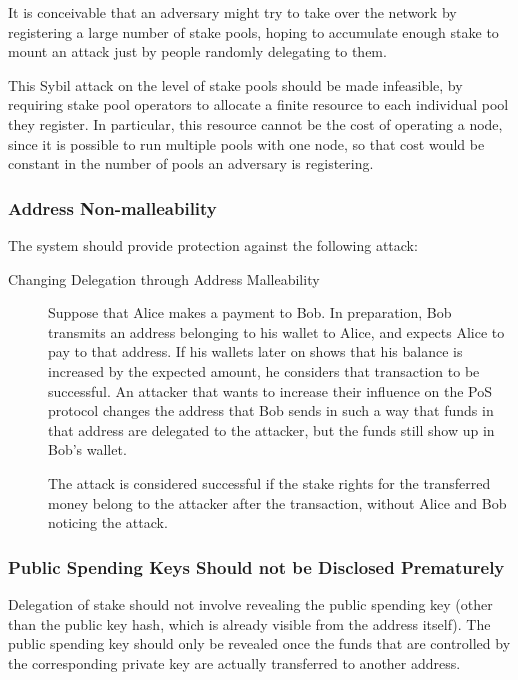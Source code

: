 \documentclass[11pt,a4paper,dvipsnames,twosided]{article}
\begin{document}
It is conceivable that an adversary might try to take over the
network by registering a large number of stake pools, hoping to
accumulate enough stake to mount an attack just by people randomly
delegating to them.

This Sybil attack on the level of stake pools should be made infeasible,
by requiring stake pool operators to allocate a finite resource to each
individual pool they register. In particular, this resource cannot be
the cost of operating a node, since it is possible to run multiple pools
with one node, so that cost would be constant in the number of pools an
adversary is registering.

\subsubsection{Address Non-malleability}
\label{address-nonmalleability}

The system should provide protection against the following attack:

\begin{description}
\item[Changing Delegation through Address Malleability]
Suppose that Alice makes a payment to Bob. In preparation, Bob transmits
an address belonging to his wallet to Alice, and expects Alice to pay to
that address. If his wallets later on shows that his balance is
increased by the expected amount, he considers that transaction to be
successful. An attacker that wants to increase their influence on the
PoS protocol changes the address that Bob sends in such a way that funds
in that address are delegated to the attacker, but the funds still show
up in Bob's wallet.

The attack is considered successful if the stake rights for the
transferred money belong to the attacker after the transaction, without
Alice and Bob noticing the attack.
\end{description}

\subsubsection{Public Spending Keys Should not be Disclosed Prematurely}
\label{public-spending-keys-should-not-be-disclosed-prematurely}

Delegation of stake should not involve revealing the public spending key (other
than the public key hash, which is already visible from the address itself). The
public spending key should only be revealed once the funds that are controlled
by the corresponding private key are actually transferred to another address.
\end{document}
